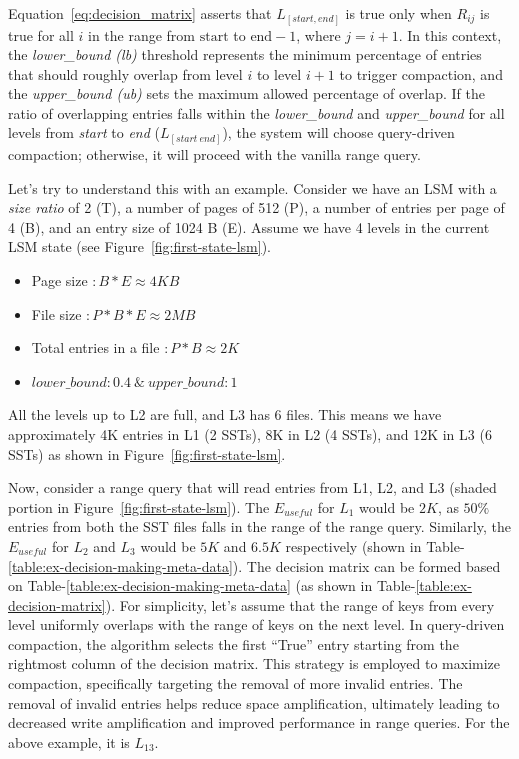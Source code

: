 Equation~\eqref{eq:decision_matrix} asserts that \(L_{[start, end]}\) is true only when \(R_{ij}\) is true for all 
\(i\) in the range from \(\text{start}\) to \(\text{end}-1\), where \(j = i+1\). In this context, the 
\textit{lower\_bound (lb)} threshold represents the minimum percentage of entries that should roughly overlap from 
level \(i\) to level \(i+1\) to trigger compaction, and the \textit{upper\_bound (ub)} sets the maximum allowed 
percentage of overlap. If the ratio of overlapping entries falls within the \textit{lower\_bound} and \textit{upper\_bound} 
for all levels from \textit{start} to \textit{end} (\(L_{[start\ end]}\)), the system will choose query-driven 
compaction; otherwise, it will proceed with the vanilla range query.

Let's try to understand this with an example. Consider we have an LSM with a \textit{size ratio} of 2 (T), a number
of pages of 512 (P), a number of entries per page of 4 (B), and an entry size of 1024 B (E). Assume we have 4 levels in 
the current LSM state (see Figure~\ref{fig:first-state-lsm}).

\begin{itemize}
    \item Page size $\colon B * E \approx 4 KB$
    \item File size $\colon P * B * E \approx 2 MB$
    \item Total entries in a file $\colon P * B \approx 2 K$
    \item $lower\_bound \colon 0.4\ \&\ upper\_bound \colon 1$ 
\end{itemize}

All the levels up to L2 are full, and L3 has 6 files. This means we have approximately 4K entries in L1 (2 SSTs), 8K in 
L2 (4 SSTs), and 12K in L3 (6 SSTs) as shown in Figure~\ref{fig:first-state-lsm}.

Now, consider a range query that will read entries from L1, L2, and L3 (shaded portion in Figure~\ref{fig:first-state-lsm}).
The $E_{useful}$ for $L_1$ would be $2K$, as $50\%$ entries from both the SST files falls in the range of the range query.
Similarly, the $E_{useful}$ for $L_2$ and $L_3$ would be $5K$ and $6.5K$ respectively (shown in Table-\ref{table:ex-decision-making-meta-data}). 
The decision matrix can be formed based on Table-\ref{table:ex-decision-making-meta-data} (as shown in 
Table-\ref{table:ex-decision-matrix}). For simplicity, let's assume that the range of keys from every level uniformly 
overlaps with the range of keys on the next level. In query-driven compaction, the algorithm selects the first ``True''
entry starting from the rightmost column of the decision matrix. This strategy is employed to maximize compaction, 
specifically targeting the removal of more invalid entries. The removal of invalid entries helps reduce space 
amplification, ultimately leading to decreased write amplification and improved performance in range queries.
For the above example, it is $L_{13}$.

